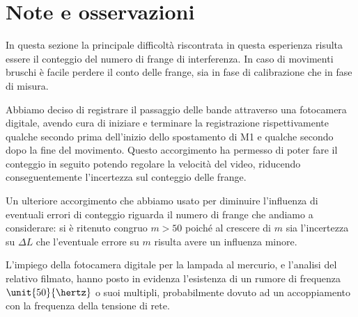 \section{Note e osservazioni}
In questa sezione la principale difficoltà
riscontrata in questa esperienza risulta essere il conteggio del
numero di frange di interferenza.
In caso di movimenti bruschi è facile
perdere il conto delle frange, sia in fase di 
calibrazione che in fase di misura. 

Abbiamo deciso di registrare 
il passaggio delle bande attraverso una fotocamera digitale,
avendo cura di iniziare e terminare la registrazione rispettivamente qualche 
secondo prima dell'inizio dello spostamento di M1
e qualche secondo dopo la fine del movimento.
Questo accorgimento ha permesso di poter fare il conteggio in seguito
potendo regolare la velocità del video, riducendo conseguentemente l'incertezza 
sul conteggio delle frange.

Un ulteriore accorgimento  che abbiamo usato per diminuire l'influenza 
di eventuali errori di conteggio riguarda il numero di frange che andiamo a 
considerare: si è ritenuto congruo $m> 50$
poiché al crescere di $m$ sia l'incertezza su $\Delta L$ che l'eventuale 
errore su $m$ risulta avere un influenza minore.

L'impiego della fotocamera digitale per la lampada al mercurio, e l'analisi del
relativo filmato, hanno posto in evidenza l'esistenza di un rumore di frequenza $\unit{50}{\hertz}$ o 
suoi multipli, probabilmente dovuto ad un accoppiamento con la frequenza della tensione di rete.
